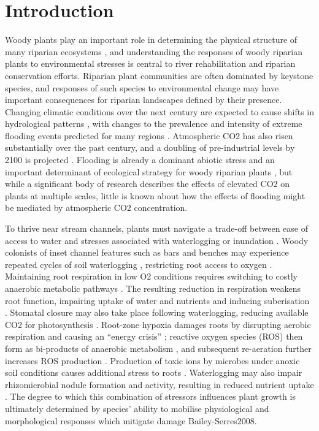 \documentclass[12pt,a4paper]{memoir}
\begin{document}
\clearpage

\section{Introduction}
Woody plants play an important role in determining the physical structure of many riparian ecosystems \cite{Lawson2015}, and understanding the responses of woody riparian plants to environmental stresses is central to river rehabilitation and riparian conservation efforts. Riparian plant communities are often dominated by keystone species, and responses of such species to environmental change may have important consequences for riparian landscapes defined by their presence. Changing climatic conditions over the next century are expected to cause shifts in hydrological patterns \cite{stocker2013climate}, with changes to the prevalence and intensity of extreme flooding events predicted for many regions \cite{Hennessy2008}. Atmospheric CO2 has also risen substantially over the past century, and a doubling of pre-industrial levels by 2100 is projected \cite{IPCC2014}. Flooding is already a dominant abiotic stress and an important determinant of ecological strategy for woody riparian plants \cite{Blom1996,Lawson2015}, but while a significant body of research describes the effects of elevated CO2 on plants at multiple scales, little is known about how the effects of flooding might be mediated by atmospheric CO2 concentration.

To thrive near stream channels, plants must navigate a trade-off between ease of access to water and stresses associated with waterlogging or inundation \cite{Naiman1993, Colmer2009}. Woody colonists of inset channel features such as bars and benches may experience repeated cycles of soil waterlogging \cite{Corenblit2009}, restricting root access to oxygen \cite{Voesenek2015}. Maintaining root respiration in low O2 conditions requires switching to costly anaerobic metabolic pathways \cite{Drew1997}. The resulting reduction in respiration weakens root function, impairing uptake of water and nutrients \cite{Piedade2010, Voesenek2015} and inducing suberisation \cite{Steudle2000}. Stomatal closure may also take place following waterlogging, reducing available CO2 for photosynthesis \cite{Kozlowski1984, Else2009}. Root-zone hypoxia damages roots by disrupting aerobic respiration and causing an “energy crisis” \cite{Colmer2009}; reactive oxygen species (ROS) then form as bi-products of anaerobic metabolism \cite{Santosa2007}, and  subsequent re-aeration further increases ROS production \cite{Steffens2013}. Production of toxic ions by microbes under anoxic soil conditions causes additional stress to roots \cite{Blom1996}. Waterlogging may also impair rhizomicrobial nodule formation and activity, resulting in reduced nutrient uptake \cite{Dawson1989, Shimono2012}. The degree to which this combination of stressors influences plant growth is ultimately determined by species’ ability to mobilise physiological and morphological responses which mitigate damage {Bailey-Serres2008}.
  
\end{document}
